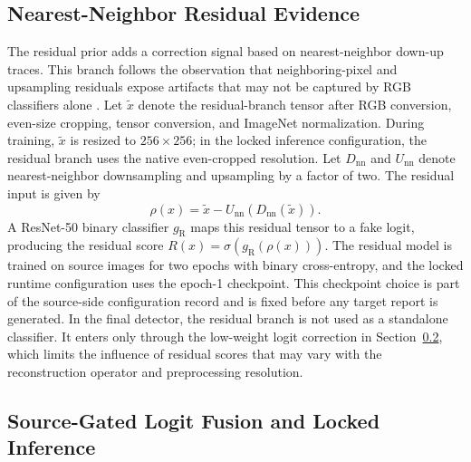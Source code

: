 \documentclass[letterpaper,journal]{IEEEtran}
\begin{document}
\subsection{Nearest-Neighbor Residual Evidence}
\label{sec:method_residual}

The residual prior adds a correction signal based on nearest-neighbor down-up traces. This branch follows the observation that neighboring-pixel and upsampling residuals expose artifacts that may not be captured by RGB classifiers alone \cite{tan2024npr}. Let $\tilde{x}$ denote the residual-branch tensor after RGB conversion, even-size cropping, tensor conversion, and ImageNet normalization. During training, $\tilde{x}$ is resized to $256 \times 256$; in the locked inference configuration, the residual branch uses the native even-cropped resolution. Let $D_{\mathrm{nn}}$ and $U_{\mathrm{nn}}$ denote nearest-neighbor downsampling and upsampling by a factor of two. The residual input is given by
\[
    \rho(x)=\tilde{x}-U_{\mathrm{nn}}(D_{\mathrm{nn}}(\tilde{x})).
\]
A ResNet-50 binary classifier $g_{\mathrm{R}}$ maps this residual tensor to a fake logit, producing the residual score $R(x)=\sigma(g_{\mathrm{R}}(\rho(x)))$. The residual model is trained on source images for two epochs with binary cross-entropy, and the locked runtime configuration uses the epoch-1 checkpoint. This checkpoint choice is part of the source-side configuration record and is fixed before any target report is generated. In the final detector, the residual branch is not used as a standalone classifier. It enters only through the low-weight logit correction in Section~\ref{sec:method_fusion}, which limits the influence of residual scores that may vary with the reconstruction operator and preprocessing resolution.

\subsection{Source-Gated Logit Fusion and Locked Inference}
\label{sec:method_fusion}
\end{document}
